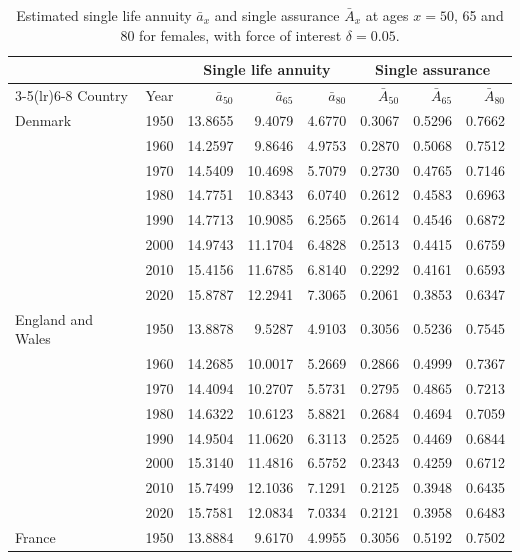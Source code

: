 \documentclass[12pt]{article}
\begin{document}
\begin{table}[htb!]
\centering
\footnotesize
\renewcommand{\arraystretch}{0.7}
\caption{Estimated single life annuity $\bar{a}_x$ and single assurance $\bar{A}_x$ at ages $x=50$, 65 and 80 for females, with force of interest $\delta=0.05$.}
\label{tab:actuarial}
\begin{tabular*}{\textwidth}{@{\extracolsep{\fill}}llrrrrrr}
\toprule
& & \multicolumn{3}{c}{Single life annuity} & \multicolumn{3}{c}{Single assurance}\\
\cmidrule(lr){3-5}\cmidrule(lr){6-8}
Country & Year & $\bar{a}_{50}$ & $\bar{a}_{65}$ & $\bar{a}_{80}$ & $\bar{A}_{50}$ & $\bar{A}_{65}$ & $\bar{A}_{80}$\\
\midrule
Denmark & 1950 & 13.8655 & 9.4079 & 4.6770 & 0.3067 & 0.5296 & 0.7662\\
 & 1960 & 14.2597 & 9.8646 & 4.9753 & 0.2870 & 0.5068 & 0.7512\\
 & 1970 & 14.5409 & 10.4698 & 5.7079 & 0.2730 & 0.4765 & 0.7146\\
 & 1980 & 14.7751 & 10.8343 & 6.0740 & 0.2612 & 0.4583 & 0.6963\\
 & 1990 & 14.7713 & 10.9085 & 6.2565 & 0.2614 & 0.4546 & 0.6872\\
 & 2000 & 14.9743 & 11.1704 & 6.4828 & 0.2513 & 0.4415 & 0.6759\\
 & 2010 & 15.4156 & 11.6785 & 6.8140 & 0.2292 & 0.4161 & 0.6593\\
 & 2020 & 15.8787 & 12.2941 & 7.3065 & 0.2061 & 0.3853 & 0.6347\\
\addlinespace[3pt]
England and Wales & 1950 & 13.8878 & 9.5287 & 4.9103 & 0.3056 & 0.5236 & 0.7545\\
 & 1960 & 14.2685 & 10.0017 & 5.2669 & 0.2866 & 0.4999 & 0.7367\\
 & 1970 & 14.4094 & 10.2707 & 5.5731 & 0.2795 & 0.4865 & 0.7213\\
 & 1980 & 14.6322 & 10.6123 & 5.8821 & 0.2684 & 0.4694 & 0.7059\\
 & 1990 & 14.9504 & 11.0620 & 6.3113 & 0.2525 & 0.4469 & 0.6844\\
 & 2000 & 15.3140 & 11.4816 & 6.5752 & 0.2343 & 0.4259 & 0.6712\\
 & 2010 & 15.7499 & 12.1036 & 7.1291 & 0.2125 & 0.3948 & 0.6435\\
 & 2020 & 15.7581 & 12.0834 & 7.0334 & 0.2121 & 0.3958 & 0.6483\\
\addlinespace[3pt]
France & 1950 & 13.8884 & 9.6170 & 4.9955 & 0.3056 & 0.5192 & 0.7502\\

\end{tabular*}
\end{table}
\end{document}
